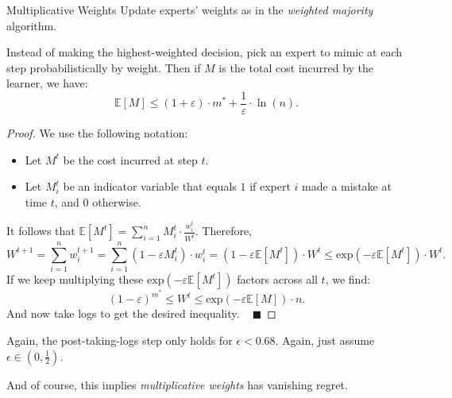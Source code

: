 \begin{solution}{Multiplicative Weights}
    Update experts' weights as in the \emph{weighted majority} algorithm.

    Instead of making the highest-weighted decision, pick an expert to mimic at each step probabilistically by weight.  Then if $M$ is the total cost incurred by the learner, we have:
    \[ \mathbb{E}[M] \leq (1 + \varepsilon) \cdot m^* + \dfrac{1}{\varepsilon} \cdot \ln(n). \]
\end{solution}

\vspace{-0.6cm}

\begin{proof}
    We use the following notation:
    \begin{itemize}
        \item Let $M^t$ be the cost incurred at step $t$.
        \item Let $M_i^t$ be an indicator variable that equals $1$ if expert $i$ made a mistake at time $t$, and $0$ otherwise.
    \end{itemize}
    It follows that $\mathbb{E}[M^t] = \sum_{i = 1}^n M_i^t \cdot \frac{w_i^t}{W^t}$.  Therefore,
    \[ W^{t + 1} = \sum_{i = 1}^n w_i^{t + 1} = \sum_{i = 1}^n (1 - \varepsilon M_i^t) \cdot w_i^t = (1 - \varepsilon \mathbb{E}[M^t]) \cdot W^t \leq \mathrm{exp}\left(-\varepsilon \mathbb{E}[M^t]\right) \cdot W^t.\]
    If we keep multiplying these $\mathrm{exp} \left ( - \varepsilon \mathbb{E}[M^t]\right)$ factors across all $t$, we find:
    \[ (1 - \varepsilon)^{m^*} \leq W^t \leq \mathrm{exp}\left(-\varepsilon \mathbb{E}[M]\right) \cdot n. \]
    And now take logs to get the desired inequality. ~ $\blacksquare$
\end{proof}

\begin{remark}
    Again, the post-taking-logs step only holds for $\epsilon < 0.68$.  Again, just assume $\epsilon \in (0, \frac{1}{2})$.
\end{remark}

And of course, this implies \emph{multiplicative weights} has vanishing regret.

